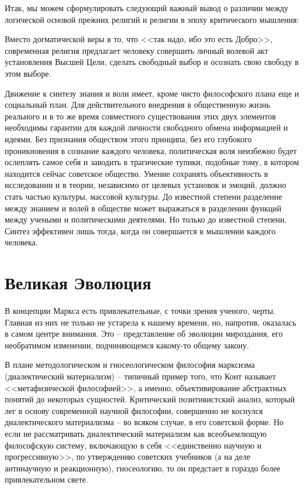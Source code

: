 \documentclass{book}
\begin{document}
Итак, мы можем сформулировать следующий важный вывод о различии между логической основой прежних религий и религии в эпоху критического мышления:

Вместо догматической веры в то, что <<так надо, ибо это есть Добро>>, современная религия предлагает человеку совершить личный волевой акт установления Высшей Цели, сделать свобод­ный выбор и осознать свою свободу в этом выборе.

Движение к синтезу знания и воли имеет, кроме чисто философского плана еще и социальный план. Для действительного внедрения в общественную жизнь реального и в то же время совместного существования этих двух элементов необходимы гарантии для каждой личности свободного обмена информацией и идеями. Без признания обществом этого принципа, без его глубокого проникновения в сознание каждого человека, политическая воля неизбежно будет ослеплять самое себя и заводить в трагические тупики, подобные тому, в котором находится сейчас советское общество. Умение сохранять объективность в исследовании и в теории, независимо от целевых установок и эмоций, должно стать частью культуры, массовой культуры. До известной степени разделение между знанием и волей в обществе может выражаться в разделении функций между учеными и политическими деятелями. Но только до известной степени. Синтез эффективен лишь тогда, когда он со­вершается в мышлении каждого человека.

\section{Великая Эволюция}

В концепции Маркса есть привлекательные, с точки зрения ученого, черты. Главная из них не только не устарела к нашему времени, но, напротив, оказалась в самом центре внимания. Это -- представление об эволюции мироздания, его необрати­мом изменении, подчиняющемся какому-то общему закону.

В плане методологическом и гносеологическом философия марксизма (диалектический материализм) -- типичный пример того, что Конт называет <<метафизической философией>>, а именно, объективирование абстрактных понятий до некоторых сущностей. Критический позитивистский анализ, который лег в ос­нову современной научной философии, совершенно не коснулся диалектического материализма -- во всяком случае, в его советской форме. Но если не рассматривать диалектический ма­териализм как всеобъемлющую философскую систему, включающую в себя <<единственно научную и прогрессивную>>, по утверждению советских учебников (а на деле антинаучную и реакционную), гносеологию, то он предстает в гораздо более привлекательном свете.
\end{document}
